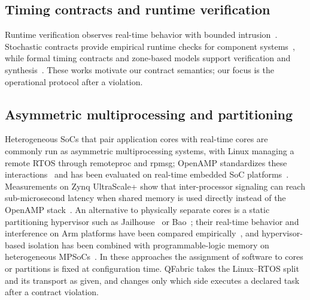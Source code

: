 \documentclass[conference]{IEEEtran}
\newcommand{\system}{QFabric\xspace}
\begin{document}
\subsection{Timing contracts and runtime verification}
Runtime verification observes real-time behavior with bounded
intrusion~\cite{reinbacher2014runtime}. Stochastic contracts provide
empirical runtime checks for component systems~\cite{nandi2015contracts},
while formal timing contracts and zone-based models support verification and
synthesis~\cite{alkhatib2016timing,camilli2018adaptive}. These works motivate
our contract semantics; our focus is the operational protocol after a
violation.

\subsection{Asymmetric multiprocessing and partitioning}
Heterogeneous SoCs that pair application cores with real-time cores are
commonly run as asymmetric multiprocessing systems, with Linux managing a
remote RTOS through remoteproc and rpmsg; OpenAMP standardizes these
interactions~\cite{openampProject} and has been evaluated on real-time
embedded SoC platforms~\cite{alonso2021openamp}. Measurements on Zynq
UltraScale+ show that inter-processor signaling can reach sub-microsecond
latency when shared memory is used directly instead of the OpenAMP
stack~\cite{coppik2025lowlatency}. An alternative to physically separate cores
is a static partitioning hypervisor such as Jailhouse~\cite{ramsauer2017jailhouse}
or Bao~\cite{martins2020bao}; their real-time behavior and interference on Arm
platforms have been compared empirically~\cite{martins2023partitioning}, and
hypervisor-based isolation has been combined with programmable-logic memory on
heterogeneous MPSoCs~\cite{gracioli2019mixed}. In these approaches the
assignment of software to cores or partitions is fixed at configuration time.
\system takes the Linux--RTOS split and its transport as given, and changes
only which side executes a declared task after a contract violation.
\end{document}
